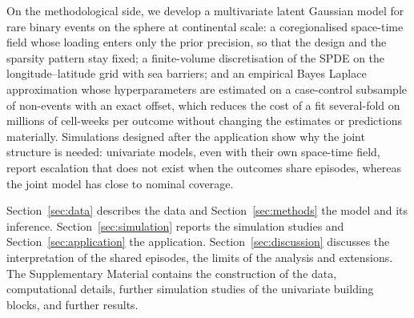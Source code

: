 On the methodological side, we develop a multivariate latent Gaussian model for rare
binary events on the sphere at continental scale: a coregionalised space-time field
whose loading enters only the prior precision, so that the design and the sparsity
pattern stay fixed; a finite-volume discretisation of the SPDE on the
longitude--latitude grid with sea barriers; and an empirical Bayes Laplace
approximation whose hyperparameters are estimated on a case-control subsample of
non-events with an exact offset, which reduces the cost of a fit several-fold on
millions of cell-weeks per outcome without changing the estimates or predictions
materially. Simulations designed after the application show why the joint structure
is needed: univariate models, even with their own space-time field, report escalation
that does not exist when the outcomes share episodes, whereas the joint model has
close to nominal coverage.

Section~\ref{sec:data} describes the data and Section~\ref{sec:methods} the model and
its inference. Section~\ref{sec:simulation} reports the simulation studies and
Section~\ref{sec:application} the application. Section~\ref{sec:discussion}
discusses the interpretation of the shared episodes, the limits of the analysis and
extensions. The Supplementary Material contains the construction of the data,
computational details, further simulation studies of the univariate building blocks,
and further results.
